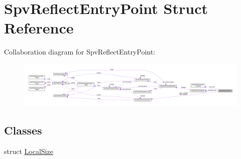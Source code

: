 \hypertarget{structSpvReflectEntryPoint}{}\section{Spv\+Reflect\+Entry\+Point Struct Reference}
\label{structSpvReflectEntryPoint}


Collaboration diagram for Spv\+Reflect\+Entry\+Point\+:\nopagebreak
\begin{figure}[H]
\begin{center}
\leavevmode
\includegraphics[width=350pt]{structSpvReflectEntryPoint__coll__graph}
\end{center}
\end{figure}
\subsection*{Classes}
\begin{DoxyCompactItemize}
\item 
struct \hyperlink{structSpvReflectEntryPoint_1_1LocalSize}{Local\+Size}
\end{DoxyCompactItemize}
